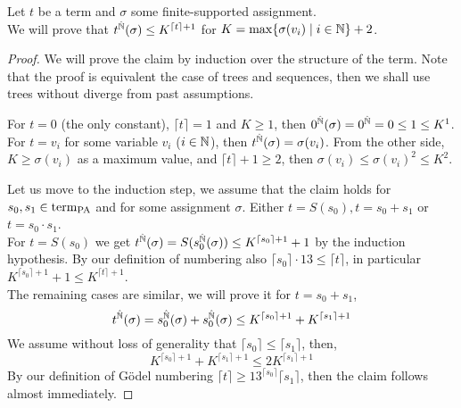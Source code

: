 \question{}
Let $t$ be a term and $\sigma$ some finite-supported assignment. \\
We will prove that $t^{\hat{\mathbb{N}}}(\sigma) \le K^{\lceil t \rceil + 1}$ for $K = \max\{ \sigma(v_i) \mid i \in \mathbb{N} \} + 2$.
\begin{proof}
	We will prove the claim by induction over the structure of the term.
	Note that the proof is equivalent the case of trees and sequences, then we shall use trees without diverge from past assumptions.

	For $t = 0$ (the only constant), $\lceil t \rceil = 1$ and $K \ge 1$, then $0^{\hat{\mathbb{N}}}(\sigma) = 0^{\hat{\mathbb{N}}} = 0 \le 1 \le K^1$. \\
	For $t = v_i$ for some variable $v_i$ ($i \in \mathbb{N}$), then $t^{\hat{\mathbb{N}}}(\sigma) = \sigma(v_i)$.
	From the other side, $K \ge \sigma(v_i)$ as a maximum value, and $\lceil t \rceil + 1 \ge 2$, then $\sigma(v_i) \le {\sigma(v_i)}^{2} \le K^2$.

	Let us move to the induction step, we assume that the claim holds for $s_0, s_1 \in \operatorname{term}_{\operatorname{PA}}$ and for some assignment $\sigma$.
	Either $t = S(s_0), t = s_0 + s_1$ or $t = s_0 \cdot s_1$. \\
	For $t = S(s_0)$ we get $t^{\hat{\mathbb{N}}}(\sigma) = S(s_0^{\hat{\mathbb{N}}}(\sigma)) \le K^{\lceil s_0 \rceil + 1} + 1$ by the induction hypothesis.
	By our definition of numbering also $\lceil s_0 \rceil \cdot 13 \le \lceil t \rceil$, in particular $K^{\lceil s_0 \rceil + 1} + 1 \le K^{\lceil t \rceil + 1}$. \\
	The remaining cases are similar, we will prove it for $t = s_0 + s_1$,
	\[
		t^{\hat{\mathbb{N}}}(\sigma) = s_0^{\hat{\mathbb{N}}}(\sigma) + s_0^{\hat{\mathbb{N}}}(\sigma) \le K^{\lceil s_0 \rceil + 1} + K^{\lceil s_1 \rceil + 1}
	\]
	We assume without loss of generality that $\lceil s_0 \rceil \le \lceil s_1 \rceil$, then,
	\[
		K^{\lceil s_0 \rceil + 1} + K^{\lceil s_1 \rceil + 1}
		\le 2K^{\lceil s_1 \rceil + 1}
	\]
	By our definition of Gödel numbering $\lceil t \rceil \ge 13^{\lceil s_0 \rceil} \lceil s_1 \rceil$, then the claim follows almost immediately.
\end{proof}


